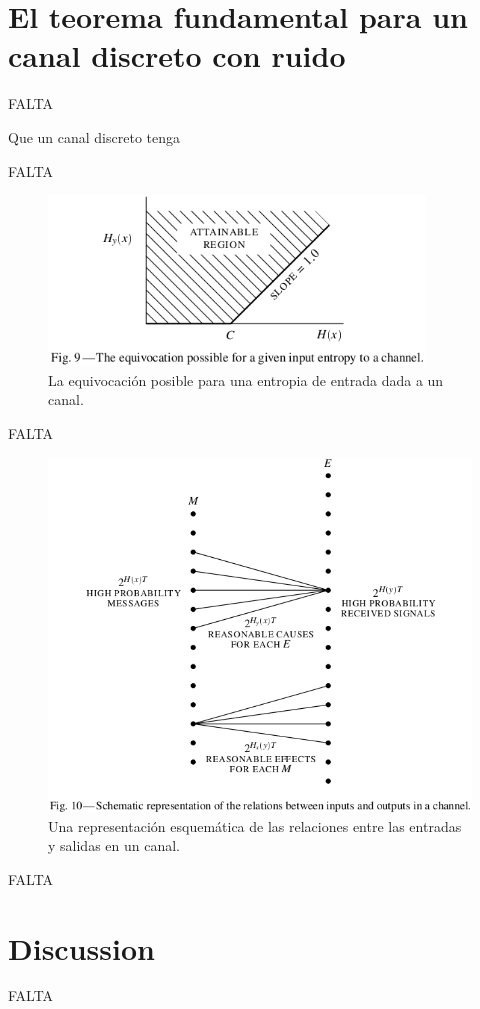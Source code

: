 \clearpage

\chapter{El teorema fundamental para un canal discreto con ruido}
\label{sec:13}

FALTA

\begin{theorem}
\label{th:11}
Que un canal discreto tenga
\end{theorem}

FALTA

\begin{figure}[!ht]
\centerline{\includegraphics[width=100mm]{Imagenes/Pagina22-Figura9.png}}
\caption{La equivocaci\'{o}n posible para una entropia de entrada dada
  a un canal.}
\label{fig:9}
\end{figure}

FALTA

\begin{figure}[!ht]
\centerline{\includegraphics[width=140mm]{Imagenes/Pagina23-Figura10.png}}
\caption{Una representaci\'{o}n esquem\'{a}tica de las relaciones
  entre las entradas y salidas en un canal.}
\label{fig:10}
\end{figure}

FALTA

\clearpage

\chapter{Discussion}
\label{sec:14}

FALTA

